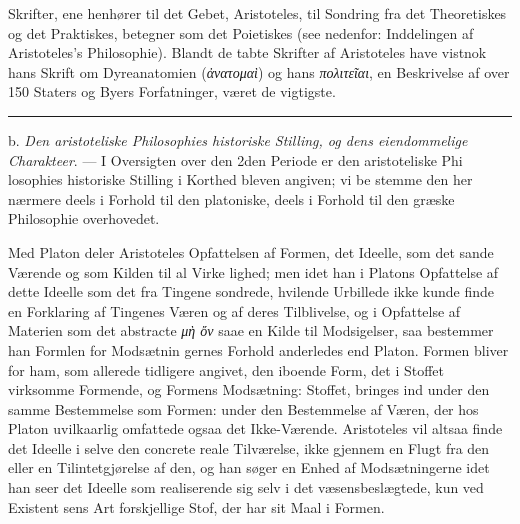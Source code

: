 \documentclass[12pt,a4paper]{book}
\newcommand{\divrule}{\begin{center}\rule{2cm}{0.4pt}\end{center}}
\newcommand{\gk}[1]{\textit{#1}}
\begin{document}
Skrifter, ene henhører til det Gebet, Aristoteles, til Sondring fra
det Theoretiskes og det Praktiskes, betegner som det Poietiskes
(see nedenfor: Inddelingen af Aristoteles's Philosophie). Blandt
de tabte Skrifter af Aristoteles have vistnok hans Skrift om
Dyreanatomien (\gk{ἀνατομαὶ}) og hans \gk{πολιτεῖαι}, en Beskrivelse
af over 150 Staters og Byers Forfatninger, været de vigtigste.

\divrule

b. \emph{Den aristoteliske Philosophies historiske
Stilling, og dens eiendommelige Charakteer}. --- I
Oversigten over den 2den Periode er den aristoteliske Phi\-%
losophies historiske Stilling i Korthed bleven angiven; vi be\-%
stemme den her nærmere deels i Forhold til den platoniske,
deels i Forhold til den græske Philosophie overhovedet.

Med Platon deler Aristoteles Opfattelsen af Formen, det
Ideelle, som det sande Værende og som Kilden til al Virke\-%
lighed; men idet han i Platons Opfattelse af dette Ideelle som
det fra Tingene sondrede, hvilende Urbillede ikke kunde finde
en Forklaring af Tingenes Væren og af deres Tilblivelse, og i
Opfattelse af Materien som det abstracte \gk{μὴ ὄν} saae en Kilde
til Modsigelser, saa bestemmer han Formlen for Modsætnin\-%
gernes Forhold anderledes end Platon. Formen bliver for ham,
som allerede tidligere angivet, den iboende Form, det i Stoffet
virksomme Formende, og Formens Modsætning: Stoffet, bringes
ind under den samme Bestemmelse som Formen: under den
Bestemmelse af Væren, der hos Platon uvilkaarlig omfattede
ogsaa det Ikke-Værende. Aristoteles vil altsaa finde det
Ideelle i selve den concrete reale Tilværelse, ikke gjennem
en Flugt fra den eller en Tilintetgjørelse af den, og han søger
en Enhed af Modsætningerne idet han seer det Ideelle som
realiserende sig selv i det væsensbeslægtede, kun ved Existent\-%
sens Art forskjellige Stof, der har sit Maal i Formen.
\end{document}
